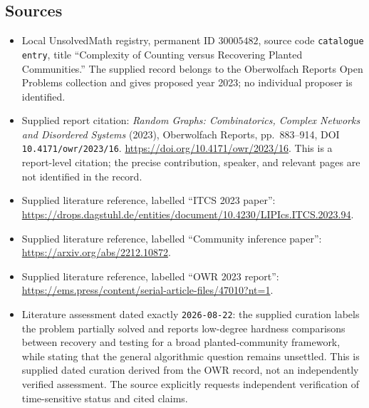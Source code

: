 \documentclass[11pt]{article}
\begin{document}
\subsection{Sources}
\begin{itemize}
\item Local UnsolvedMath registry, permanent ID \(30005482\), source code \texttt{catalogue entry}, title ``Complexity of Counting versus Recovering Planted Communities.'' The supplied record belongs to the Oberwolfach Reports Open Problems collection and gives proposed year 2023; no individual proposer is identified.
\item Supplied report citation: \emph{Random Graphs: Combinatorics, Complex Networks and Disordered Systems} (2023), Oberwolfach Reports, pp.\ 883--914, DOI \texttt{10.4171/owr/2023/16}. \url{https://doi.org/10.4171/owr/2023/16}. This is a report-level citation; the precise contribution, speaker, and relevant pages are not identified in the record.
\item Supplied literature reference, labelled ``ITCS 2023 paper'': \url{https://drops.dagstuhl.de/entities/document/10.4230/LIPIcs.ITCS.2023.94}.
\item Supplied literature reference, labelled ``Community inference paper'': \url{https://arxiv.org/abs/2212.10872}.
\item Supplied literature reference, labelled ``OWR 2023 report'': \url{https://ems.press/content/serial-article-files/47010?nt=1}.
\item Literature assessment dated exactly \texttt{2026-08-22}: the supplied curation labels the problem partially solved and reports low-degree hardness comparisons between recovery and testing for a broad planted-community framework, while stating that the general algorithmic question remains unsettled. This is supplied dated curation derived from the OWR record, not an independently verified assessment. The source explicitly requests independent verification of time-sensitive status and cited claims.
\end{itemize}
\end{document}
